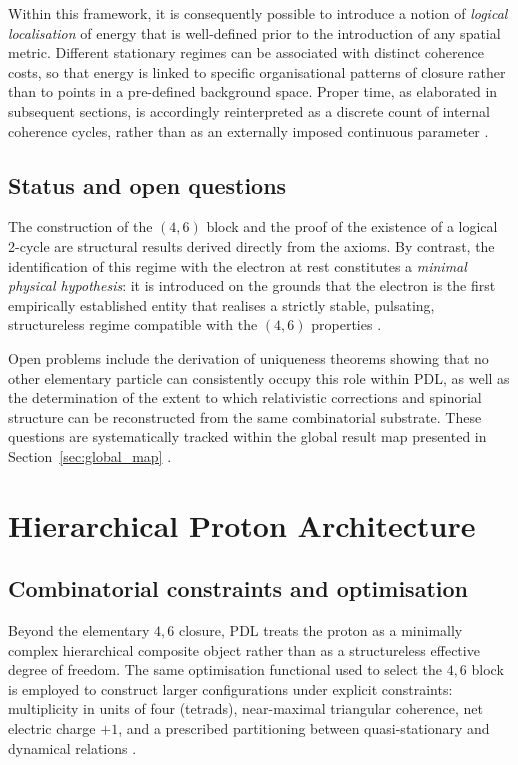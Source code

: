 \documentclass[11pt,a4paper]{article}
\begin{document}
Within this framework, it is consequently possible to introduce a notion of \emph{logical localisation} of energy that is well-defined prior to the introduction of any spatial metric. Different stationary regimes can be associated with distinct coherence costs, so that energy is linked to specific organisational patterns of closure rather than to points in a pre-defined background space. Proper time, as elaborated in subsequent sections, is accordingly reinterpreted as a discrete count of internal coherence cycles, rather than as an externally imposed continuous parameter \citep{PDL_Main_2026,PDL_position}.

\subsection{Status and open questions}
\label{subsec:electron_status}

The construction of the \((4,6)\) block and the proof of the existence of a logical 2-cycle are structural results derived directly from the axioms. By contrast, the identification of this regime with the electron at rest constitutes a \emph{minimal physical hypothesis}: it is introduced on the grounds that the electron is the first empirically established entity that realises a strictly stable, pulsating, structureless regime compatible with the \((4,6)\) properties \citep{PDL_intro}.

Open problems include the derivation of uniqueness theorems showing that no other elementary particle can consistently occupy this role within PDL, as well as the determination of the extent to which relativistic corrections and spinorial structure can be reconstructed from the same combinatorial substrate. These questions are systematically tracked within the global result map presented in Section~\ref{sec:global_map} \citep{PDL_position}.

\section{Hierarchical Proton Architecture}
\label{sec:proton_architecture}

\subsection{Combinatorial constraints and optimisation}
\label{subsec:proton_constraints}

Beyond the elementary \(4,6\) closure, PDL treats the proton as a minimally complex hierarchical composite object rather than as a structureless effective degree of freedom. The same optimisation functional used to select the \(4,6\) block is employed to construct larger configurations under explicit constraints: multiplicity in units of four (tetrads), near-maximal triangular coherence, net electric charge \(+1\), and a prescribed partitioning between quasi-stationary and dynamical relations \citep{PDL_Main_2026,Combinatorial_Proton_v2_2026}.
\end{document}

